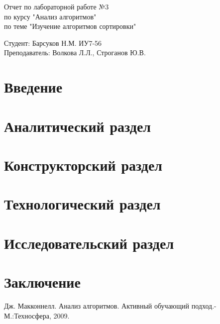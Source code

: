\documentclass[a4paper, 14pt]{article}
\begin{document}
	\begin{titlepage}
		\begin{center}
			\begin{LARGE}
				Отчет по лабораторной работе №3\\
				по курсу "Анализ алгоритмов"\\
				по теме "Изучение алгоритмов сортировки"
			\end{LARGE}
			
			\begin{Large}
				\vspace{10cm}
				Студент: Барсуков Н.М. ИУ7-56\\
				Преподаватель: Волкова Л.Л.,
				Строганов Ю.В.
			\end{Large}
		\end{center}
	\end{titlepage}

	\newpage
	\tableofcontents

	\newpage
	\section*{Введение}
	
	
	\newpage
	\section{Аналитический раздел}
	
	
	\newpage
	\section{Конструкторский раздел}
	
	
	\newpage
	\section{Технологический раздел}
	
	
	\newpage
	\section{Исследовательский раздел}
	
	
	\newpage
	\section{Заключение}
	
	
	\newpage
	\begin{thebibliography}{4}
		Дж. Макконнелл. Анализ алгоритмов. Активный обучающий подход.-
		М.:Техносфера, 2009.
	\end{thebibliography}
	
	
\end{document}
